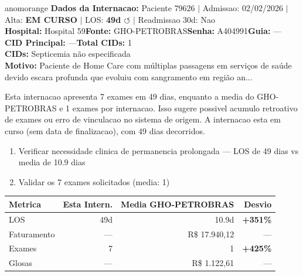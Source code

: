 \documentclass[a4paper,10pt]{article}
\begin{document}
\begin{anomalycard}[Internacao 164595 | GHO-PETROBRAS | ALTO (z=3.38)]{anomorange}
\textbf{Dados da Internacao:} Paciente 79626 $\mid$ Admissao: 02/02/2026 $\mid$ Alta: \textcolor{anomorange}{\textbf{EM CURSO}} $\mid$ LOS: \textbf{49d \textcolor{anomorange}{$\circlearrowleft$}} $\mid$ Readmissao 30d: Nao\\
\textbf{Hospital:} Hospital 59\quad\textbf{Fonte:} GHO-PETROBRAS\quad\textbf{Senha:} A404991\quad\textbf{Guia:} ---\\
\textbf{CID Principal:} {\small ---}\quad\textbf{Total CIDs:} 1\\

\textbf{CIDs:} {\scriptsize Septicemia não especificada}\\

\textbf{Motivo:} {\scriptsize Paciente de Home Care com múltiplas passagens em serviços de saúde devido escara profunda que evoluiu com sangramento em região an...}\\

\vspace{2pt}\begin{tcolorbox}[colback=severityred!20,colframe=anomorange,title={\textbf{Interpretacao de Negocio}},fonttitle=\bfseries\small,left=4pt,right=4pt,top=3pt,bottom=3pt]
{\small Esta internacao apresenta 7 exames em 49 dias, enquanto a media do GHO-PETROBRAS e 1 exames por internacao. Isso sugere possivel acumulo retroativo de exames ou erro de vinculacao no sistema de origem. A internacao esta em curso (sem data de finalizacao), com 49 dias decorridos.}
\end{tcolorbox}
\begin{tcolorbox}[colback=severityyellow!30,colframe=anomorange,title={\textbf{Recomendacoes Especificas}},fonttitle=\bfseries\small,left=4pt,right=4pt,top=3pt,bottom=3pt]
\begin{enumerate}[nosep,leftmargin=16pt]
\item {\small Verificar necessidade clinica de permanencia prolongada --- LOS de 49 dias vs media de 10.9 dias}
\item {\small Validar os 7 exames solicitados (media: 1)}
\end{enumerate}
\end{tcolorbox}
\begin{center}\begin{tabular}{l r r r}\toprule\textbf{Metrica} & \textbf{Esta Intern.} & \textbf{Media GHO-PETROBRAS} & \textbf{Desvio} \\\midrule
LOS & 49d & 10.9d & \textcolor{anomred}{\textbf{+351\%}} \\
Faturamento & --- & R\$ 17.940,12 & --- \\
Exames & 7 & 1 & \textcolor{anomred}{\textbf{+425\%}} \\
Glosas & --- & R\$ 1.122,61 & --- \\
\bottomrule\end{tabular}\end{center}


\end{anomalycard}
\end{document}
